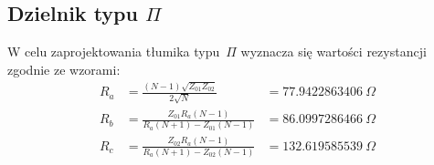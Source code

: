 \documentclass[rep.tex]{subfiles}
\begin{document}
\subsection{Dzielnik typu $\Pi$}
W celu zaprojektowania tłumika typu~$\Pi$ wyznacza się wartości rezystancji zgodnie ze wzorami:
\begin{align}
  R_a &= \frac{(N - 1) \sqrt{Z_{01}Z_{02}}}{2\sqrt{N}} &= 77.9422863406~\Omega \\
  R_b &= \frac{Z_{01}R_a(N - 1)}{R_a(N + 1) - Z_{01}(N - 1)} &= 86.0997286466~\Omega \\
  R_c &= \frac{Z_{02}R_a(N - 1)}{R_a(N + 1) - Z_{02}(N - 1)} &= 132.619585539~\Omega
\end{align}
\end{document}
